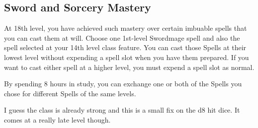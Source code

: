 \begin{multicols*}{2}
\section*{Sword and Sorcery Mastery}


At 18th level, you have achieved such mastery over certain imbuable spells that you can cast them at will. Choose one 1st-level Swordmage spell and also the spell selected at your 14th level class feature. You can cast those Spells at their lowest level without expending a spell slot when you have them prepared. If you want to cast either spell at a higher level, you must expend a spell slot as normal.

By spending 8 hours in study, you can exchange one or both of the Spells you chose for different Spells of the same levels.


\smallskip

{\color{red} I guess the class is already strong and this is a small fix on the d8 hit dice. It comes at a really late level though.  }


\end{multicols*}

\clearpage



